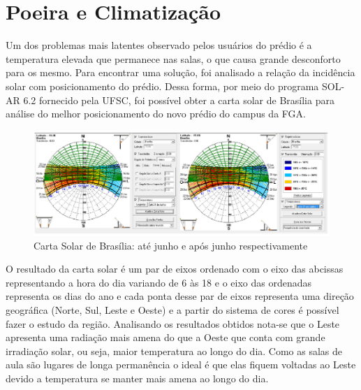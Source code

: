 \section{Poeira e Climatização}

Um dos problemas mais latentes observado pelos usuários do prédio é a temperatura elevada que permanece nas salas, o que causa grande desconforto para os mesmo. Para encontrar uma solução, foi analisado a relação da incidência solar com posicionamento do prédio. Dessa forma, por meio do programa SOL-AR 6.2 fornecido pela UFSC, foi possível obter a carta solar de Brasília para análise do melhor posicionamento do novo prédio do campus da FGA.

\begin{figure}[!h]
  \centering
  \includegraphics[keepaspectratio=true,scale=1]{figuras/cartasolar.eps}
  \caption{Carta Solar de Brasília: até junho e após junho respectivamente}
  \label{fig:carta_solar}
\end{figure}

O resultado da carta solar é um par de eixos ordenado com o eixo das abcissas representando a hora do dia variando de 6 às 18 e o eixo das ordenadas representa os dias do ano e cada ponta desse par de eixos representa uma direção geográfica (Norte, Sul, Leste e Oeste) e a partir do sistema de cores é possível fazer o estudo da região. Analisando os resultados obtidos nota-se que o Leste apresenta uma radiação mais amena do que a Oeste que conta com grande irradiação solar, ou seja, maior temperatura ao longo do dia. Como as salas de aula são lugares de longa permanência o ideal é que elas fiquem voltadas ao Leste devido a temperatura se manter mais amena ao longo do dia.

